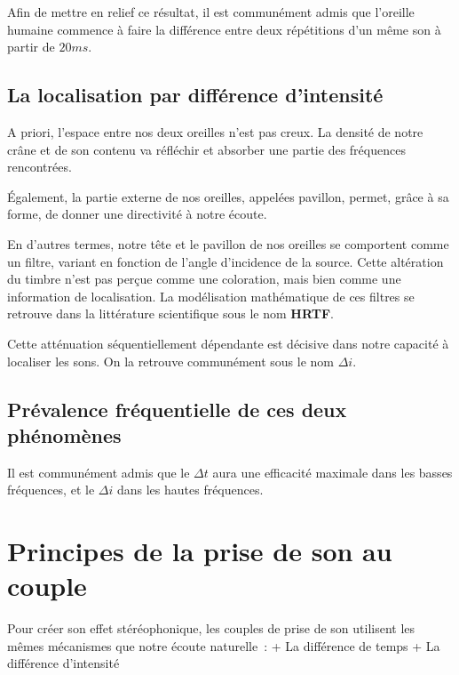 \documentclass[
]{book}
\begin{document}
Afin de mettre en relief ce résultat, il est communément admis que l'oreille humaine commence à faire la différence entre deux répétitions d'un même son à partir de \(20 ms\).

\hypertarget{la-localisation-par-diffuxe9rence-dintensituxe9}{%
\subsection{La localisation par différence d'intensité}\label{la-localisation-par-diffuxe9rence-dintensituxe9}}

A priori, l'espace entre nos deux oreilles n'est pas creux. La densité de notre crâne et de son contenu va réfléchir et absorber une partie des fréquences rencontrées.

Également, la partie externe de nos oreilles, appelées pavillon, permet, grâce à sa forme, de donner une directivité à notre écoute.

En d'autres termes, notre tête et le pavillon de nos oreilles se comportent comme un filtre, variant en fonction de l'angle d'incidence de la source. Cette altération du timbre n'est pas perçue comme une coloration, mais bien comme une information de localisation. La modélisation mathématique de ces filtres se retrouve dans la littérature scientifique sous le nom \textbf{HRTF}.

Cette atténuation séquentiellement dépendante est décisive dans notre capacité à localiser les sons. On la retrouve communément sous le nom \(\Delta i\).

\hypertarget{pruxe9valence-fruxe9quentielle-de-ces-deux-phuxe9nomuxe8nes}{%
\subsection{Prévalence fréquentielle de ces deux phénomènes}\label{pruxe9valence-fruxe9quentielle-de-ces-deux-phuxe9nomuxe8nes}}

Il est communément admis que le \(\Delta t\) aura une efficacité maximale dans les basses fréquences, et le \(\Delta i\) dans les hautes fréquences.

\hypertarget{principes-de-la-prise-de-son-au-couple}{%
\section{Principes de la prise de son au couple}\label{principes-de-la-prise-de-son-au-couple}}

Pour créer son effet stéréophonique, les couples de prise de son utilisent les mêmes mécanismes que notre écoute naturelle~:
+ La différence de temps
+ La différence d'intensité
\end{document}
